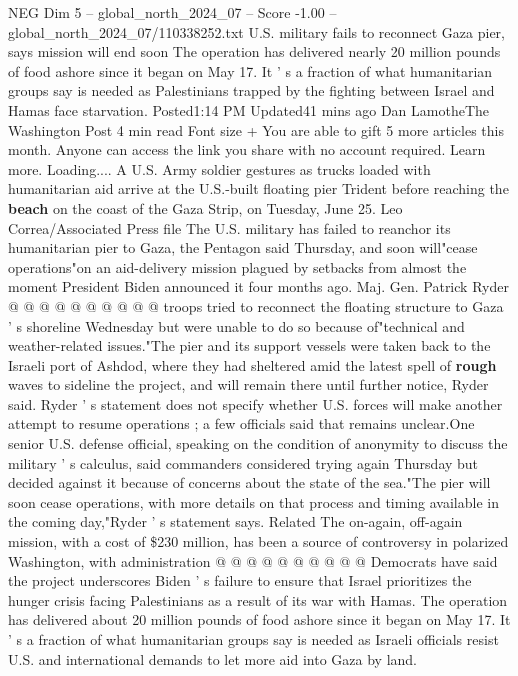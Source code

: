 \begin{textsample}{NEG Dim 5 – global\_north\_2024\_07 – Score -1.00 – global\_north\_2024\_07/110338252.txt}  \label{ex:f5_neg_151}
U.S. military fails to reconnect Gaza pier, says mission will end soon The operation has delivered nearly 20 million pounds of food ashore since it began on May 17.
It ' s a fraction of what humanitarian groups say is needed as Palestinians trapped by the fighting between Israel and Hamas face starvation.
Posted1:14 PM Updated41 mins ago Dan LamotheThe Washington Post 4 min read Font size + You are able to gift 5 more articles this month.
Anyone can access the link you share with no account required.
Learn more.
Loading....
A U.S.
Army soldier gestures as trucks loaded with humanitarian aid arrive at the U.S.-built floating pier Trident before reaching the \textbf{beach} on the coast of the Gaza Strip, on Tuesday, June 25.
Leo Correa/Associated Press file The U.S. military has failed to reanchor its humanitarian pier to Gaza, the Pentagon said Thursday, and soon will"cease operations"on an aid-delivery mission plagued by setbacks from almost the moment President Biden announced it four months ago.
Maj.
Gen.
Patrick Ryder @ @ @ @ @ @ @ @ @ @ troops tried to reconnect the floating structure to Gaza ' s shoreline Wednesday but were unable to do so because of"technical and weather-related issues."The pier and its support vessels were taken back to the Israeli port of Ashdod, where they had sheltered amid the latest spell of \textbf{rough} waves to sideline the project, and will remain there until further notice, Ryder said.
Ryder ' s statement does not specify whether U.S. forces will make another attempt to resume operations ; a few officials said that remains unclear.One senior U.S. defense official, speaking on the condition of anonymity to discuss the military ' s calculus, said commanders considered trying again Thursday but decided against it because of concerns about the state of the sea."The pier will soon cease operations, with more details on that process and timing available in the coming day,"Ryder ' s statement says.
Related The on-again, off-again mission, with a cost of \$230 million, has been a source of controversy in polarized Washington, with administration @ @ @ @ @ @ @ @ @ @ Democrats have said the project underscores Biden ' s failure to ensure that Israel prioritizes the hunger crisis facing Palestinians as a result of its war with Hamas.
The operation has delivered about 20 million pounds of food ashore since it began on May 17.
It ' s a fraction of what humanitarian groups say is needed as Israeli officials resist U.S. and international demands to let more aid into Gaza by land.

\end{textsample}
